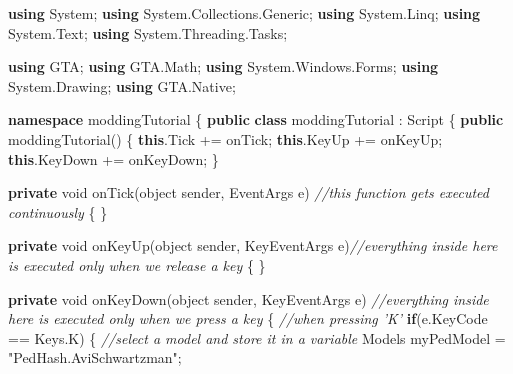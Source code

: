 \documentclass[
  openany]{book}
\newenvironment{Shaded}{\begin{snugshade}}{\end{snugshade}}
\newcommand{\CommentTok}[1]{\textcolor[rgb]{0.56,0.35,0.01}{\textit{#1}}}
\newcommand{\DataTypeTok}[1]{\textcolor[rgb]{0.13,0.29,0.53}{#1}}
\newcommand{\FunctionTok}[1]{\textcolor[rgb]{0.00,0.00,0.00}{#1}}
\newcommand{\KeywordTok}[1]{\textcolor[rgb]{0.13,0.29,0.53}{\textbf{#1}}}
\newcommand{\NormalTok}[1]{#1}
\newcommand{\StringTok}[1]{\textcolor[rgb]{0.31,0.60,0.02}{#1}}
\begin{document}
\begin{Shaded}
\begin{Highlighting}[]
\KeywordTok{using}\NormalTok{ System;}
\KeywordTok{using}\NormalTok{ System.}\FunctionTok{Collections}\NormalTok{.}\FunctionTok{Generic}\NormalTok{;}
\KeywordTok{using}\NormalTok{ System.}\FunctionTok{Linq}\NormalTok{;}
\KeywordTok{using}\NormalTok{ System.}\FunctionTok{Text}\NormalTok{;}
\KeywordTok{using}\NormalTok{ System.}\FunctionTok{Threading}\NormalTok{.}\FunctionTok{Tasks}\NormalTok{;}
 
\KeywordTok{using}\NormalTok{ GTA;}
\KeywordTok{using}\NormalTok{ GTA.}\FunctionTok{Math}\NormalTok{;}
\KeywordTok{using}\NormalTok{ System.}\FunctionTok{Windows}\NormalTok{.}\FunctionTok{Forms}\NormalTok{;}
\KeywordTok{using}\NormalTok{ System.}\FunctionTok{Drawing}\NormalTok{;}
\KeywordTok{using}\NormalTok{ GTA.}\FunctionTok{Native}\NormalTok{;}
 
 
\KeywordTok{namespace}\NormalTok{ moddingTutorial}
\NormalTok{\{}
    \KeywordTok{public} \KeywordTok{class}\NormalTok{ moddingTutorial : Script}
\NormalTok{    \{}
        \KeywordTok{public} \FunctionTok{moddingTutorial}\NormalTok{()}
\NormalTok{        \{}
            \KeywordTok{this}\NormalTok{.}\FunctionTok{Tick}\NormalTok{ += onTick;}
            \KeywordTok{this}\NormalTok{.}\FunctionTok{KeyUp}\NormalTok{ += onKeyUp;}
            \KeywordTok{this}\NormalTok{.}\FunctionTok{KeyDown}\NormalTok{ += onKeyDown;}
\NormalTok{        \}}
 
        \KeywordTok{private} \DataTypeTok{void} \FunctionTok{onTick}\NormalTok{(}\DataTypeTok{object}\NormalTok{ sender, EventArgs e) }\CommentTok{//this function gets executed continuously }
\NormalTok{        \{}
\NormalTok{        \}}
 
        \KeywordTok{private} \DataTypeTok{void} \FunctionTok{onKeyUp}\NormalTok{(}\DataTypeTok{object}\NormalTok{ sender, KeyEventArgs e)}\CommentTok{//everything inside here is executed only when we release a key}
\NormalTok{        \{}
\NormalTok{        \}}
 
        \KeywordTok{private} \DataTypeTok{void} \FunctionTok{onKeyDown}\NormalTok{(}\DataTypeTok{object}\NormalTok{ sender, KeyEventArgs e) }\CommentTok{//everything inside here is executed only when we press a key}
\NormalTok{        \{}
            \CommentTok{//when pressing 'K'}
            \KeywordTok{if}\NormalTok{(e.}\FunctionTok{KeyCode}\NormalTok{ == Keys.}\FunctionTok{K}\NormalTok{)}
\NormalTok{            \{}
                \CommentTok{//select a model and store it in a variable}
\NormalTok{                Models myPedModel = }\StringTok{"PedHash.AviSchwartzman"}\NormalTok{;}
    

\end{Highlighting}
\end{Shaded}
\end{document}
